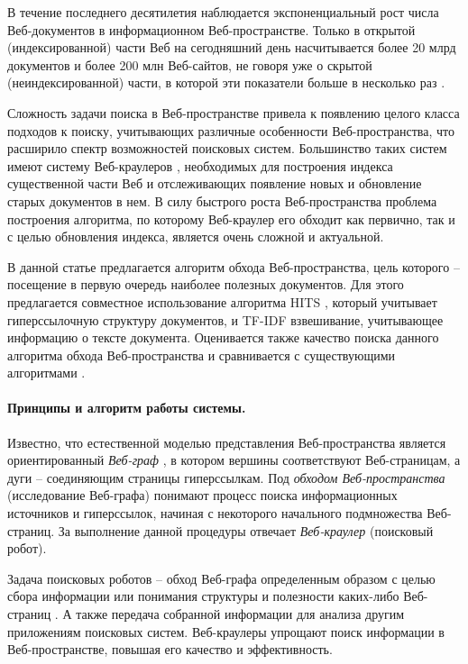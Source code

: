 В течение последнего десятилетия наблюдается экспоненциальный рост числа Веб-документов в информационном Веб-пространстве. Только в открытой (индексированной) части Веб на сегодняшний день насчитывается более 20 млрд документов и более 200 млн Веб-сайтов, не говоря уже о скрытой (неиндексированной) части, в которой эти показатели больше в несколько раз \cite{MostReliableHostingCompanySites}.

Сложность задачи поиска в Веб-пространстве привела к появлению целого класса подходов к поиску, учитывающих различные особенности Веб-пространства, что расширило спектр возможностей поисковых систем. Большинство таких систем имеют систему Веб-краулеров \cite{ArasuChoGM}, необходимых для построения индекса существенной части Веб и отслеживающих появление новых и обновление старых документов в нем. В силу быстрого роста Веб-пространства \cite{Kahle,MostReliableHostingCompanySites} проблема построения алгоритма, по которому Веб-краулер его обходит как первично, так и с целью обновления индекса, является очень сложной и актуальной.

В данной статье предлагается алгоритм обхода Веб-пространства, цель которого -- посещение в первую очередь наиболее полезных документов. Для этого предлагается совместное использование алгоритма HITS \cite{Kleinberg}, который учитывает гиперссылочную структуру документов, и TF-IDF \cite{SinghalKaszkiel} взвешивание, учитывающее информацию о тексте документа. Оценивается также качество поиска данного алгоритма обхода Веб-пространства и сравнивается с существующими алгоритмами \cite{BlekanovBondarenko2,Nekrestyanov}.

\paragraph{Принципы и алгоритм работы системы.} Известно, что естественной моделью представления Веб-пространства является ориентированный \textit{Веб-граф} \cite{BroderKumarMaghoul}, в котором вершины соответствуют Веб-страницам, а дуги -- соединяющим страницы гиперссылкам. Под \textit{обходом Веб-пространства} (исследование Веб-графа) понимают процесс поиска информационных источников и гиперссылок, начиная с некоторого начального подмножества Веб-страниц. За выполнение данной процедуры отвечает \textit{Веб-краулер} (поисковый робот).

Задача поисковых роботов -- обход Веб-графа определенным образом с целью сбора информации или понимания структуры и полезности каких-либо Веб-страниц \cite{ArasuChoGM}. А также передача собранной информации для анализа другим приложениям поисковых систем. Веб-краулеры упрощают поиск информации в Веб-пространстве, повышая его качество и эффективность.

